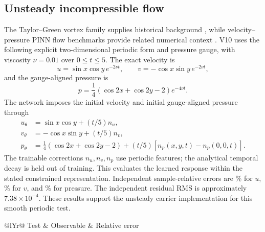 \subsection{Unsteady incompressible flow}
The Taylor--Green vortex family supplies historical background
\citep{taylor1937}, while velocity--pressure PINN flow benchmarks provide
related numerical context \citep{jin2021}. V10 uses the following explicit
two-dimensional periodic form and pressure gauge, with viscosity %
 $\nu=0.01$ over $0\leq t\leq5$. The exact velocity is
\begin{equation}
 u=\sin x\cos y\,e^{-2\nu t},\qquad
 v=-\cos x\sin y\,e^{-2\nu t},
 \label{eq:tg_velocity}
\end{equation}
and the gauge-aligned pressure is
\begin{equation}
 p=\frac{1}{4}(\cos2x+\cos2y-2)e^{-4\nu t}.
 \label{eq:tg_pressure}
\end{equation}
The network imposes the initial velocity and initial gauge-aligned pressure through
\begin{align}
 u_\theta&=\sin x\cos y+(t/5)n_u,\\
 v_\theta&=-\cos x\sin y+(t/5)n_v,\\
 p_\theta&=\tfrac14(\cos2x+\cos2y-2)
             +(t/5)[n_p(x,y,t)-n_p(0,0,t)].
\end{align}
The trainable corrections $n_u,n_v,n_p$ use periodic features; the
analytical temporal decay is held out of training. This evaluates the
learned response within the stated constrained representation. Independent
sample-relative errors are \TGU\% for $u$,
\TGV\% for $v$, and \TGP\% for pressure. The independent residual RMS is
approximately $7.38\times10^{-4}$. These results support the unsteady
carrier implementation for this smooth periodic test.


\begin{table}[htbp]\centering\small
\caption{Accepted solution-observable errors in the reduced Gaussian-model
verification problems. Residual criteria are checked separately.}
\label{tab:gaussian_errors}
\begin{tabularx}{\textwidth}{@{}lYr@{}}\toprule
Test & Observable & Relative error\\\midrule
{}
\bottomrule\end{tabularx}
\end{table}

